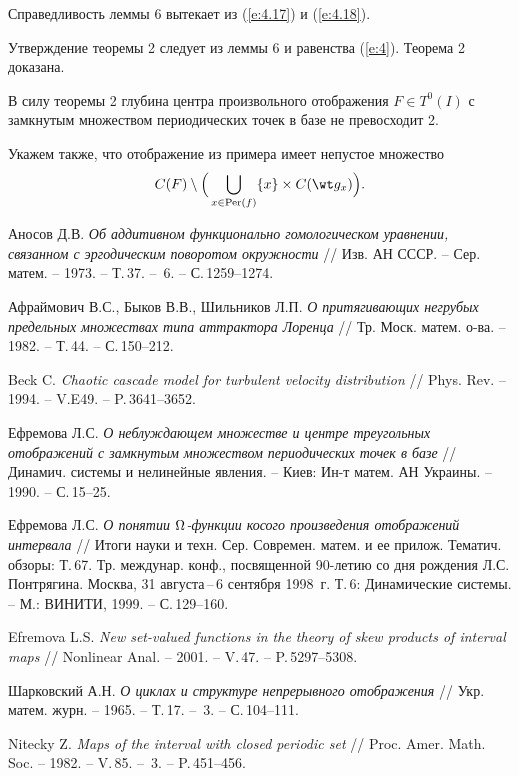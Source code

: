 Справедливость леммы 6 вытекает из (\ref{e:4.17}) и (\ref{e:4.18}).


Утверждение теоремы 2 следует из леммы 6 и равенства (\ref{e:4}).
Теорема 2 доказана.

В силу теоремы 2 глубина центра произвольного отображения
$F\in T^0(I)$ с замкнутым множеством периодических точек
в базе не превосходит 2.

Укажем также, что отображение из примера имеет непустое
множество
$$
C(F)\setminus \Big(\bigcup\limits_{x\in \Per(f)}\{x\}\times C(\wt g_x)\Big).
$$


\begin{thebibliography}{99}

Аносов Д.В. {\em Об аддитивном функционально гомологическом уравнении,
связанном с эргодическим поворотом окружности} // Изв. АН СССР. --
Сер. матем. -- 1973. -- Т.\,37. -- \No\,6. -- С.\,1259--1274.

Афраймович В.С., Быков В.В., Шильников Л.П. {\em О притягивающих
негрубых предельных множествах типа аттрактора Лоренца} //
Тр. Моск. матем. о-ва. -- 1982. -- Т.\,44. -- С.\,150--212.

Beck C. {\em Chaotic cascade model for turbulent velocity
distribution} // Phys. Rev. -- 1994. -- V.\;E49. -- P.\,3641--3652.

Ефремова Л.С. {\em О неблуждающем множестве и центре треугольных
отображений с замкнутым множеством периодических точек в базе} //
Динамич. системы и нелинейные явления. --
Киев: Ин-т матем. АН Украины. -- 1990. -- С.\,15--25.

Ефремова Л.С. {\em О понятии $\Omega$-функции косого произведения
отображений интервала} // Итоги науки и техн.
Сер. Современ. матем. и ее прилож. Тематич. обзоры:
Т.\,67. Тр. междунар. конф., посвященной 90-летию со дня рождения
Л.С.\,Понтрягина. Москва, 31 августа\,--\,6 сентября 1998~г.
Т.\,6: Динамические системы. -- М.: ВИНИТИ, 1999. -- С.\,129--160.

Efremova L.S. {\em New set-valued functions in the theory of
skew products of interval maps} // Nonlinear Anal.
-- 2001. -- V.\,47. -- P.\,5297--5308.

Шарковский А.Н. {\em О циклах и структуре непрерывного отображения} //
Укр. матем. журн. -- 1965. -- Т.\,17. -- \No\,3. -- С.\,104--111.

Nitecky Z. {\em Maps of the interval with closed periodic set} //
Proc. Amer. Math. Soc. -- 1982. -- V.\,85. -- \No\,3. -- P.\,451--456.


\end{thebibliography}

